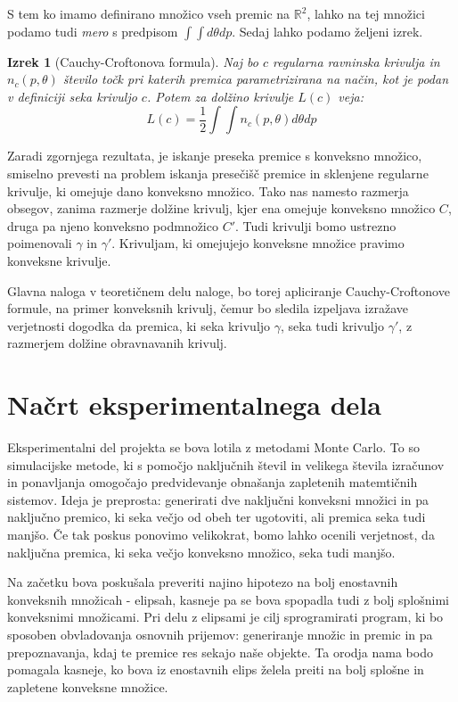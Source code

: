 \documentclass[a4paper]{article}
\newtheorem{izrek}{Izrek}
\begin{document}
S tem ko imamo definirano množico vseh premic na $\mathbb{R}^2$, lahko na tej množici podamo tudi \textit{mero} s  predpisom $ \int \int d\theta dp$. Sedaj lahko podamo željeni izrek.

\begin{izrek}[Cauchy-Croftonova formula]
 Naj bo $c$ regularna ravninska krivulja in $n_c (p, \theta)$  število točk pri katerih premica parametrizirana na način, kot je podan v definiciji seka krivuljo $c$. Potem za dolžino krivulje $L(c)$ veja: $$L(c) = \frac{1}{2}\int \int n_c (p, \theta) d\theta dp $$
 \end{izrek}

\vspace{3 mm}

Zaradi zgornjega rezultata, je iskanje preseka premice s konveksno množico, smiselno prevesti na problem iskanja presečišč premice in sklenjene regularne krivulje, ki omejuje dano konveksno množico. Tako nas namesto razmerja obsegov, zanima razmerje dolžine krivulj, kjer ena omejuje konveksno množico $C$, druga pa njeno konveksno podmnožico $C'$. Tudi krivulji bomo ustrezno poimenovali $\gamma$ in $\gamma '$. Krivuljam, ki omejujejo konveksne množice pravimo konveksne krivulje. 

Glavna naloga v teoretičnem delu naloge, bo torej apliciranje Cauchy-Croftonove formule, na primer konveksnih krivulj, čemur bo sledila izpeljava izražave verjetnosti dogodka da premica, ki seka krivuljo $\gamma$, seka tudi krivuljo $\gamma'$, z razmerjem dolžine obravnavanih krivulj. 



\section{Načrt eksperimentalnega dela}
Eksperimentalni del projekta se bova lotila z metodami Monte Carlo. To so simulacijske metode, ki s pomočjo naključnih števil in velikega števila izračunov in ponavljanja omogočajo predvidevanje obnašanja zapletenih matemtičnih sistemov. Ideja je preprosta: generirati dve naključni konveksni množici in pa naključno premico, ki seka večjo od obeh ter ugotoviti, ali premica seka tudi manjšo. Če tak poskus ponovimo velikokrat, bomo lahko ocenili verjetnost, da naključna premica, ki seka večjo konveksno množico, seka tudi manjšo.

Na začetku bova poskušala preveriti najino hipotezo na bolj enostavnih konveksnih množicah - elipsah, kasneje pa se bova spopadla tudi z bolj splošnimi konveksnimi množicami. Pri delu z elipsami je cilj sprogramirati program, ki bo sposoben obvladovanja osnovnih prijemov: generiranje množic in premic in pa prepoznavanja, kdaj te premice res sekajo naše objekte. Ta orodja nama bodo pomagala kasneje, ko bova iz enostavnih elips želela preiti na bolj splošne in zapletene konveksne množice.
\end{document}
